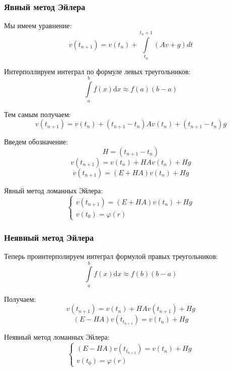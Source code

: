 \subsubsection{Явный метод Эйлера}

Мы имеем уравнение:
\[
  v(t_{n+1}) = v(t_n) + \int\limits_{t_{n}}^{t_n+1} (Av + g) dt
\]

Интерполлируем интеграл по формуле левых треугольников:
\[
  \int\limits_{a}^{b} f(x) \mathrm{d} x \approx f(a) (b - a)
\]

Тем самым получаем:
\[
  v(t_{n+1}) = v(t_n) + (t_{n+1} - t_n) Av(t_n) + (t_{n+1} - t_n) g
\]

Введем обозначение:
\[
  H = (t_{n+1} - t_n)
\]
\[
  v(t_{n+1}) = v(t_n) + H Av(t_n) + H g
\]
\[
  v(t_{n+1}) = (E + HA)v(t_n) + Hg
\]

Явный метод ломанных Эйлера:
\[
  \begin{cases}
    v(t_{n+1}) = (E + HA)v(t_n) + Hg \\
    v(t_0) = \varphi(r)
  \end{cases}
\]

\subsubsection{Неявный метод Эйлера}

Теперь проинтерполируем интеграл формулой правых треугольников:
\[
  \int\limits_{a}^{b} f(x) \mathrm{d} x \approx f(b) (b - a)
\]

Получаем:
\[
  v(t_{n+1}) = v(t_n) + HAv(t_{n+1}) + Hg
\]
\[
  (E - HA) v(t_{t_{n+1}}) = v(t_n) + Hg
\]

Неявный метод ломанных Эйлера:
\[
  \begin{cases}
    (E - HA) v(t_{t_{n+1}}) = v(t_n) + Hg \\
    v(t_0) = \varphi(r)
  \end{cases}
\]